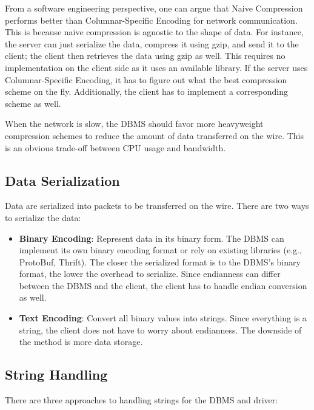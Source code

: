 \documentclass[11pt]{article}
\begin{document}
From a software engineering perspective, one can argue that Naive Compression performs better 
than Columnar-Specific Encoding for network communication. This is because naive 
compression is agnostic to the shape of data. For instance, the server can just serialize the data, 
compress it using gzip, and send it to the client; the client then retrieves the data using gzip as 
well. This requires no implementation on the client side as it uses an available library. If the 
server uses Columnar-Specific Encoding, it has to figure out what the best compression scheme on the 
fly. Additionally, the client has to implement a corresponding scheme as well. 

When the network is slow, the DBMS should favor more heavyweight compression schemes to reduce the 
amount of data transferred on the wire. This is an obvious trade-off between CPU usage and 
bandwidth.

\subsection*{Data Serialization}
Data are serialized into packets to be transferred on the wire. There are two ways to serialize the data:

\begin{itemize}
    \item \textbf{Binary Encoding}:
    Represent data in its binary form. The DBMS can implement its own 
    binary encoding format or rely on existing libraries (e.g., ProtoBuf, Thrift). The closer the 
    serialized format is to the DBMS's binary format, the lower the overhead to serialize. Since 
    endianness can differ between the DBMS and the client, the client has to handle endian 
    conversion as well. 
    
    \item \textbf{Text Encoding}:
    Convert all binary values into strings. Since everything is a 
    string, the client does not have to worry about endianness. The downside of the method is more 
    data storage.
\end{itemize}

\subsection*{String Handling}
There are three approaches to handling strings for the DBMS and driver:
\end{document}
